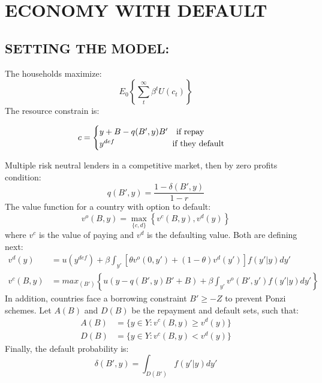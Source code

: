 \documentclass[11pt, a4paper]{article}
\theoremstyle{definition}
\begin{document}
\section{ECONOMY WITH DEFAULT}
	\subsection{SETTING THE MODEL:}
	The households maximize:
	\begin{equation}
		E_0\left\{ \sum_t^{\infty} \beta^t U(c_t)\right\}
	\end{equation}
	The resource constrain is:
	\begin{center}
	\begin{equation*}
	 c =
	 \begin{cases}
	 y + B - q(B',y)B' \quad \text{if repay}\\
	 y^{def}	 \text{\hspace{2.3cm} if they default}
	 \end{cases}
	\end{equation*}
	\end{center}
	Multiple risk neutral lenders in a competitive market, then by zero profits condition:
	\begin{equation}
		q(B',y) = \frac{1-\delta(B',y)}{1-r}
	\end{equation}
	The value function for a country with option to default:
	\begin{equation}
		v^o(B,y) = \max_{\{c,d\}}\left\{ v^c(B,y),v^d(y)\right\}
	\end{equation}
	where $v^c$ is the value of paying and $v^d$ is the defaulting value. Both are defining next:
	\begin{align}
	v^d(y) &= u(y^{def}) + \beta\int_{y'} \left[ \theta v^o(0,y') + (1-\theta)v^d(y')\right]f(y'|y)dy'\\
	v^c(B,y) &= max_{(B')}\left\{ u(y - q(B',y)B'+B) + \beta\int_{y'}v^o(B',y')f(y'|y)dy' \right\}
	\end{align}
	In addition, countries face a borrowing constraint $B'\geq -Z$ to prevent Ponzi schemes. Let $A(B)$ and $D(B)$ be the repayment and default sets, such that:
	\begin{align}
	 A(B)&=\{y \in Y: v^c(B,y)\geq v^d(y)\}\\
	 D(B)&=\{y \in  Y: v^c(B,y)< v^d(y)\}
	\end{align}
	Finally, the default probability is:
	\begin{equation}
		\delta(B',y) = \int_{D(B')}f(y'|y)dy'
	\end{equation}
\end{document}
